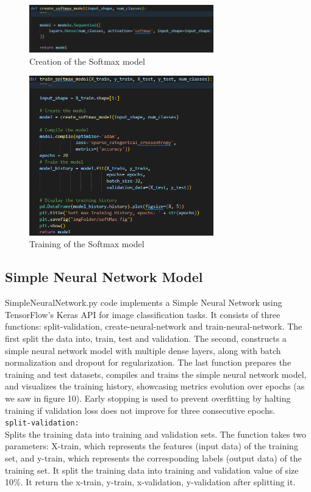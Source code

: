 \documentclass{article}
\newcommand{\code}[1]{\colorbox{light-gray}{\texttt{#1}}}
\begin{document}
\begin{figure}[H]
\caption{Creation of the Softmax model}
\centering
\includegraphics[width=8cm]{imgFolder/create_softmax_model.png}
\end{figure}

\begin{figure}[H]
\caption{Training of the Softmax model}
\centering
\includegraphics[width=8cm]{imgFolder/train_softmax_model.png}
\end{figure}

\newpage
\subsection{Simple Neural Network Model}
SimpleNeuralNetwork.py code implements a Simple Neural Network using TensorFlow's Keras API for image classification tasks.
It consists of three functions: split-validation, create-neural-network and train-neural-network.
The first split the data into, train, test and validation. The second, constructs a simple neural network model with multiple dense layers, along with batch normalization and dropout for regularization. The last function prepares the training and test datasets, compiles and trains the simple neural network model, and visualizes the training history, showcasing metrics evolution over epochs (as we saw in figure 10). Early stopping is used to prevent overfitting by halting training if validation loss does not improve for three consecutive epochs.\\\newline
\code{split-validation:}\\\newline
Splits the training data into training and validation sets.
The function takes two parameters: X-train, which represents the features (input data) of the training set, and y-train, which represents the corresponding labels (output data) of the training set.
It split the training data into training and validation value of size 10\%.
It return the x-train, y-train, x-validation, y-validation after splitting it.
\end{document}
